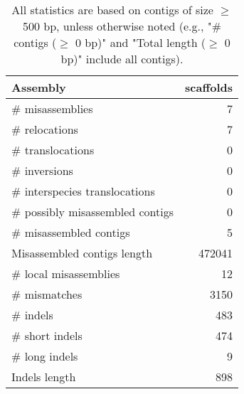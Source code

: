 \documentclass[12pt,a4paper]{article}
\begin{document}
\begin{table}[ht]
\begin{center}
\caption{All statistics are based on contigs of size $\geq$ 500 bp, unless otherwise noted (e.g., "\# contigs ($\geq$ 0 bp)" and "Total length ($\geq$ 0 bp)" include all contigs).}
\begin{tabular}{|l*{1}{|r}|}
\hline
Assembly & scaffolds \\ \hline
\# misassemblies & 7 \\ \hline
\hspace{5mm}\# relocations & 7 \\ \hline
\hspace{5mm}\# translocations & 0 \\ \hline
\hspace{5mm}\# inversions & 0 \\ \hline
\hspace{5mm}\# interspecies translocations & 0 \\ \hline
\# possibly misassembled contigs & 0 \\ \hline
\# misassembled contigs & 5 \\ \hline
Misassembled contigs length & 472041 \\ \hline
\# local misassemblies & 12 \\ \hline
\# mismatches & 3150 \\ \hline
\# indels & 483 \\ \hline
\hspace{5mm}\# short indels & 474 \\ \hline
\hspace{5mm}\# long indels & 9 \\ \hline
Indels length & 898 \\ \hline
\end{tabular}
\end{center}
\end{table}
\end{document}
